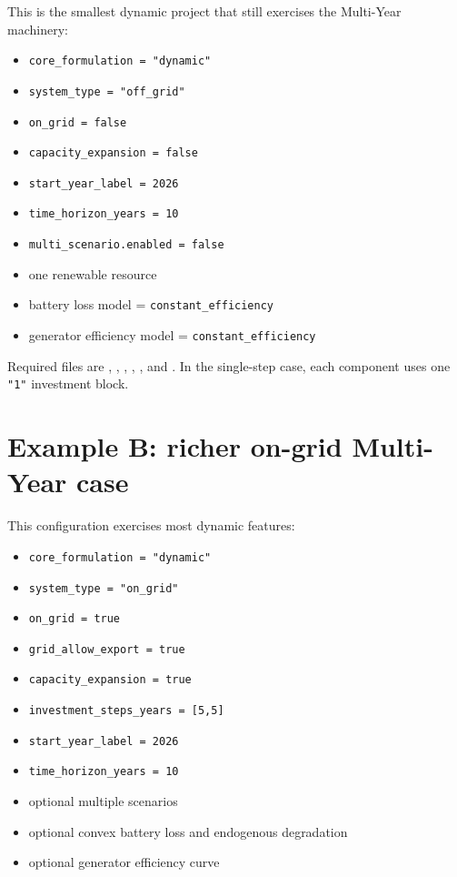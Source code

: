 \documentclass[11pt,a4paper]{report}
\newcommand{\code}[1]{\texttt{#1}}
\begin{document}
This is the smallest dynamic project that still exercises the Multi-Year machinery:

\begin{itemize}[leftmargin=1.5em]
  \item \code{core\_formulation = "dynamic"}
  \item \code{system\_type = "off\_grid"}
  \item \code{on\_grid = false}
  \item \code{capacity\_expansion = false}
  \item \code{start\_year\_label = 2026}
  \item \code{time\_horizon\_years = 10}
  \item \code{multi\_scenario.enabled = false}
  \item one renewable resource
  \item battery loss model = \code{constant\_efficiency}
  \item generator efficiency model = \code{constant\_efficiency}
\end{itemize}

Required files are , , , , , and . In the single-step case, each component uses one \code{"1"} investment block.

\section{Example B: richer on-grid Multi-Year case}

This configuration exercises most dynamic features:

\begin{itemize}[leftmargin=1.5em]
  \item \code{core\_formulation = "dynamic"}
  \item \code{system\_type = "on\_grid"}
  \item \code{on\_grid = true}
  \item \code{grid\_allow\_export = true}
  \item \code{capacity\_expansion = true}
  \item \code{investment\_steps\_years = [5,5]}
  \item \code{start\_year\_label = 2026}
  \item \code{time\_horizon\_years = 10}
  \item optional multiple scenarios
  \item optional convex battery loss and endogenous degradation
  \item optional generator efficiency curve
\end{itemize}
\end{document}
